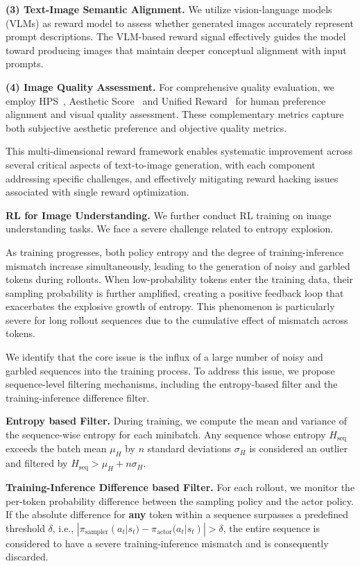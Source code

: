 \documentclass{article}
\begin{document}
\textbf{(3) Text-Image Semantic Alignment.} We utilize vision-language models (VLMs) as reward model to assess whether generated images accurately represent prompt descriptions. The VLM-based reward signal effectively guides the model toward producing images that maintain deeper conceptual alignment with input prompts. 

\textbf{(4) Image Quality Assessment.}
For comprehensive quality evaluation, we employ HPS~\cite{wu2023human, ma2025hpsv3}, Aesthetic Score~\cite{Laion2022} and Unified Reward~\cite{wang2025unified} for human preference alignment and visual quality assessment. These complementary metrics capture both subjective aesthetic preference and objective quality metrics. 




This multi-dimensional reward framework enables systematic improvement across several critical aspects of text-to-image generation, with each component addressing specific challenges, and effectively mitigating reward hacking issues associated with single reward optimization.


\textbf{RL for Image Understanding.} We further conduct RL training on image understanding tasks. We face a severe challenge related to entropy explosion. 

As training progresses, both policy entropy and the degree of training-inference mismatch increase simultaneously, leading to the generation of noisy and garbled tokens during rollouts. When low-probability tokens enter the training data, their sampling probability is further amplified, creating a positive feedback loop that exacerbates the explosive growth of entropy. This phenomenon is particularly severe for long rollout sequences due to the cumulative effect of mismatch across tokens.

We identify that the core issue is the influx of a large number of noisy and garbled sequences into the training process. To address this issue, we propose sequence-level filtering mechanisms, including the entropy-based filter and the training-inference difference filter. 

\textbf{Entropy based Filter.} During training, we compute the mean and variance of the sequence-wise entropy for each minibatch. Any sequence whose entropy $H_{\text{seq}}$ exceeds the batch mean $\mu_H$ by $n$ standard deviations $\sigma_H$ is considered an outlier and filtered by 
$H_{\text{seq}} > \mu_H + n \sigma_H$. 

\textbf{Training-Inference Difference based Filter.} 
For each rollout, we monitor the per-token probability difference between the sampling policy and the actor policy. If the absolute difference for \textbf{any} token within a sequence surpasses a predefined threshold $\delta$, i.e., $|\pi_{\text{sampler}}(a_t|s_t) - \pi_{\text{actor}}(a_t|s_t)| > \delta$, the entire sequence is considered to have a severe training-inference mismatch and is consequently discarded.
\end{document}
